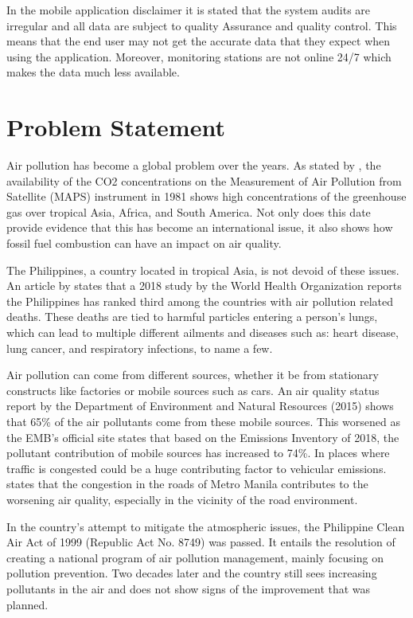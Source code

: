 In the mobile application disclaimer it is stated that the system audits are irregular and all data are subject to quality Assurance and quality control. This means that the end user may not get the accurate data that they expect when using the application. Moreover, monitoring stations are not online 24/7 which makes the data much less available.


\section{Problem Statement}
	Air pollution has become a global problem over the years. As stated by \cite{Akimoto2004}, the availability of the CO2 concentrations on the Measurement of Air Pollution from Satellite (MAPS) instrument in 1981 shows high concentrations of the greenhouse gas over tropical Asia, Africa, and South America. Not only does this date provide evidence that this has become an international issue, it also shows how fossil fuel combustion can have an impact on air quality. 

The Philippines, a country located in tropical Asia, is not devoid of these issues. An article by \cite{abano_2019} states that a 2018 study by the World Health Organization reports the Philippines has ranked third among the countries with air pollution related deaths. These deaths are tied to harmful particles entering a person’s lungs, which can lead to multiple different ailments and diseases such as: heart disease, lung cancer, and respiratory infections, to name a few.

Air pollution can come from different sources, whether it be from stationary constructs like factories or mobile sources such as cars. \cite{EMB_2015}  An air quality status report by the Department of Environment and Natural Resources (2015) shows that 65\% of the air pollutants come from these mobile sources. This worsened as the EMB’s official site \cite{EMB_2018} states that based on the Emissions Inventory of 2018, the pollutant contribution of mobile sources has increased to  74\%. In places where traffic is congested could be a huge contributing factor to vehicular emissions. \cite{vergel_yai2000} states that the congestion in the roads of Metro Manila contributes to the worsening air quality, especially in the vicinity of the road environment.

In the country’s attempt to mitigate the atmospheric issues, the Philippine Clean Air Act of 1999 (Republic Act No. 8749) was passed. \cite{FAO} It entails the resolution of creating a national program of air pollution management, mainly focusing on pollution prevention. Two decades later and the country still sees increasing pollutants in the air and does not show signs of the improvement that was planned.

